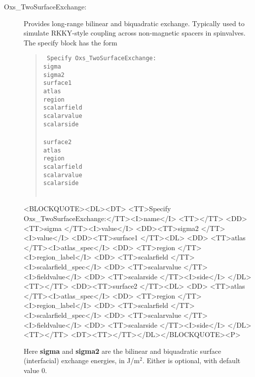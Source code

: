 \begin{description}
%
\item[Oxs\_TwoSurfaceExchange:]
   Provides long-range bilinear and biquadratic exchange.  Typically
   used to simulate RKKY-style coupling across non-magnetic spacers in
   spinvalves.  The specify block has the form
   \begin{latexonly}
      \begin{quote}\tt
      Specify Oxs\_TwoSurfaceExchange: \ocb\\
        \bi sigma \\
        \bi sigma2 \\
        \bi surface1 \ocb\\
        \bi \bi atlas  \\
        \bi \bi region \\
        \bi \bi scalarfield \\
        \bi \bi scalarvalue \\
        \bi \bi scalarside  \\
        \bi \ccb\\
        \bi surface2 \ocb\\
        \bi \bi atlas  \\
        \bi \bi region \\
        \bi \bi scalarfield \\
        \bi \bi scalarvalue \\
        \bi \bi scalarside  \\
        \bi \ccb\\
      \ccb
      \end{quote}
   \end{latexonly}
   \begin{rawhtml}
   <BLOCKQUOTE><DL><DT>
   <TT>Specify Oxs_TwoSurfaceExchange:</TT><I>name</I> <TT>{</TT>
   <DD><TT>sigma  </TT><I>value</I>
   <DD><TT>sigma2 </TT><I>value</I>
   <DD><TT>surface1 {</TT><DL>
       <DD> <TT>atlas </TT><I>atlas_spec</I>
       <DD> <TT>region </TT><I>region_label</I>
       <DD> <TT>scalarfield </TT><I>scalarfield_spec</I>
       <DD> <TT>scalarvalue </TT><I>fieldvalue</I>
       <DD> <TT>scalarside </TT><I>side</I>
   </DL><TT>}</TT>
   <DD><TT>surface2 {</TT><DL>
       <DD> <TT>atlas </TT><I>atlas_spec</I>
       <DD> <TT>region </TT><I>region_label</I>
       <DD> <TT>scalarfield </TT><I>scalarfield_spec</I>
       <DD> <TT>scalarvalue </TT><I>fieldvalue</I>
       <DD> <TT>scalarside </TT><I>side</I>
   </DL><TT>}</TT>
   <DT><TT>}</TT></DL></BLOCKQUOTE><P>
   \end{rawhtml}
   Here \textbf{sigma} and \textbf{sigma2} are the bilinear and
   biquadratic surface (interfacial) exchange energies, in
   J/m${}^2$.  Either is optional, with default value 0.


\end{description}
